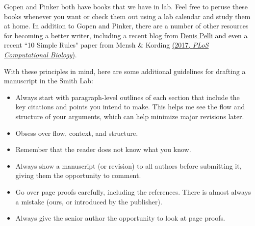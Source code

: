 \documentclass[letterpaper,12pt,oneside]{memoir}
\begin{document}
Gopen and Pinker both have books that we have in lab. Feel free to peruse these books whenever you want or check them out using a lab calendar and study them at home. In addition to Gopen and Pinker, there are a number of other resources for becoming a better writer, including a recent blog from \href{http://psych.nyu.edu/pelli/style.html}{Denis Pelli} and even a recent ``10 Simple Rules" paper from Mensh \& Kording \href{http://journals.plos.org/ploscompbiol/article?id=10.1371/journal.pcbi.1005619}{(2017, \textit{PLoS Computational Biology})}.

With these principles in mind, here are some additional guidelines for drafting a manuscript in the Smith Lab:

\begin{itemize}
\item Always start with paragraph-level outlines of each section that include the key citations and points you intend to make. This helps me see the flow and structure of your arguments, which can help minimize major revisions later. 
\item Obsess over flow, context, and structure.
\item Remember that the reader does not know what you know.
\item Always show a manuscript (or revision) to all authors before submitting it, giving them the opportunity to comment.
\item Go over page proofs carefully, including the references. There is almost always a mistake (ours, or introduced by the publisher).
\item Always give the senior author the opportunity to look at page proofs.
\end{itemize}
\end{document}
